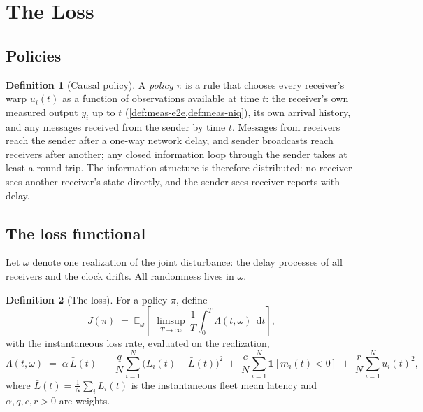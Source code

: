 \documentclass[11pt, a4paper]{article}
\theoremstyle{definition}
\newtheorem{definition}{Definition}[section]
\theoremstyle{plain}
\theoremstyle{remark}
\newcommand{\E}{\mathbb{E}}
\newcommand{\dd}{\,\mathrm{d}}
\newcommand{\ind}[1]{\mathbf{1}\!\left[#1\right]}
\newcommand{\Lbar}{\bar{L}}
\begin{document}
\section{The Loss}\label{sec:loss}

\subsection{Policies}\label{sec:policies}

\begin{definition}[Causal policy]\label{def:policy}
A \emph{policy} $\pi$ is a rule that chooses every receiver's warp
$u_i(t)$ as a function of observations available at time $t$: the
receiver's own measured output $y_i$ up to $t$
(\cref{def:meas-e2e,def:meas-niq}), its own arrival history, and any
messages received from the sender by time $t$.  Messages from receivers reach the sender after a one-way network
delay, and sender broadcasts reach receivers after another; any
closed information loop through the sender takes at least a round
trip.  The information structure is therefore
distributed: no receiver sees another receiver's state directly, and the
sender sees receiver reports with delay.
\end{definition}

\subsection{The loss functional}\label{sec:loss-functional}

Let $\omega$ denote one realization of the joint disturbance: the delay
processes of all receivers and the clock drifts.  All randomness lives in
$\omega$.

\begin{definition}[The loss]\label{def:loss}
For a policy $\pi$, define
\begin{equation}\label{eq:loss}
  J(\pi) \;=\;
  \E_\omega\!\left[\;
    \limsup_{T\to\infty}\,
    \frac{1}{T}\int_0^{T} \Lambda(t,\omega)\;\dd t
  \right],
\end{equation}
with the instantaneous loss rate, evaluated on the realization,
\begin{equation}\label{eq:pointwise-loss}
  \Lambda(t,\omega)
  \;=\;
  \alpha\,\Lbar(t)
  \;+\;
  \frac{q}{N}\sum_{i=1}^{N}\bigl(L_i(t)-\Lbar(t)\bigr)^2
  \;+\;
  \frac{c}{N}\sum_{i=1}^{N}\ind{m_i(t) < 0}
  \;+\;
  \frac{r}{N}\sum_{i=1}^{N}\dot u_i(t)^2 ,
\end{equation}
where $\Lbar(t) = \frac1N\sum_i L_i(t)$ is the instantaneous fleet mean
latency and $\alpha, q, c, r > 0$ are weights.
\end{definition}
\end{document}
